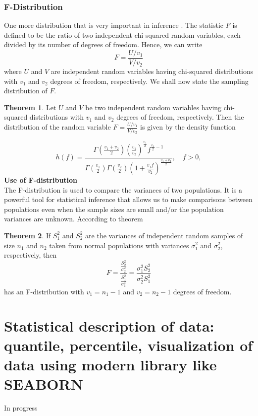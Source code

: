 \documentclass[12pt,a4paper]{article}
\theoremstyle{example}
\theoremstyle{definition}
\theoremstyle{theorem}
\newtheorem{theorem}{Theorem}
\begin{document}
\subsubsection{F-Distribution }
One more distribution that is very important in inference . 
The statistic \(F\) is defined to be the ratio of two independent chi-squared random variables, each divided by its number of degrees of freedom. Hence, we can write
\[ F = \frac{U/v_1}{V/v_2} \]
where \(U\) and \(V\) are independent random variables having chi-squared distributions with \(v_1\) and \(v_2\) degrees of freedom, respectively. We shall now state the sampling distribution of \(F\).
\begin{theorem}
    Let \(U\) and \(V\) be two independent random variables having chi-squared distributions with \(v_1\) and \(v_2\) degrees of freedom, respectively. Then the distribution of the random variable \(F = \frac{U/v_1}{V/v_2}\) is given by the density function


\end{theorem}
$$h(f) =
\frac{\Gamma\left(\frac{v_1 + v_2}{2}\right)\left(\frac{v_1}{v_2}\right)^{\frac{v_1}{2}} f^{\frac{v_1}{2} - 1}}{\Gamma\left(\frac{v_1}{2}\right)\Gamma\left(\frac{v_2}{2}\right)(1 + \frac{v_1 f}{v_2})^{\frac{v_1 + v_2}{2}}}, \quad f > 0,
$$
\textbf{Use of F-distribution}\\
The F-distribution is used to compare the variances of two populations. It is a powerful tool for statistical inference that allows us to make comparisons between populations even when the sample sizes are small and/or the population variances are unknown. According to theorem \citep{walpole1993probability}
\begin{theorem}
    If \(S_1^2\) and \(S_2^2\) are the variances of independent random samples of size \(n_1\) and \(n_2\) taken from normal populations with variances \(\sigma_1^2\) and \(\sigma_2^2\), respectively, then
\[ F = \frac{\frac{S_2^2}{\sigma_2^2}}{\frac{S_1^2}{\sigma_1^2}} = \frac{\sigma_1^2 S_2^2}{\sigma_2^2 S_1^2} \]
has an F-distribution with \(v_1 = n_1 - 1\) and \(v_2 = n_2 - 1\) degrees of freedom.

\end{theorem}
\section{Statistical description of data: quantile, percentile, visualization of data
using modern library like SEABORN}
In progress
\end{document}
